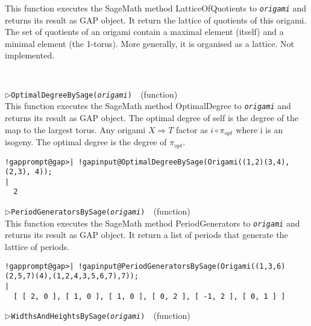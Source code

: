 \documentclass[a4paper,11pt]{report}
\begin{document}
{{{ This function executes the SageMath method LatticeOfQuotients to \mbox{\texttt{\mdseries\slshape origami}} and returns its result as \textsf{GAP} object. It return the lattice of quotients of this origami. The set of
quotients of an origami contain a maximal element (itself) and a minimal
element (the 1-torus). More generally, it is organised as a lattice. Not
implemented. 
\begin{Verbatim}[commandchars=!@|,fontsize=\small,frame=single,label=Example]
  
\end{Verbatim}
 \noindent\textcolor{FuncColor}{$\triangleright$\enspace\texttt{OptimalDegreeBySage({\mdseries\slshape origami})
\label{OptimalDegreeBySage}
}\hfill{\scriptsize (function)}}\\


 This function executes the SageMath method OptimalDegree to \mbox{\texttt{\mdseries\slshape origami}} and returns its result as \textsf{GAP} object. The optimal degree of self is the degree of the map to the largest
torus. Any origami $X \Rightarrow T$ factor as $i \circ \pi_{opt}$ where i is an isogeny. The optimal degree is the degree of $\pi_{opt}$. 
\begin{Verbatim}[commandchars=!@|,fontsize=\small,frame=single,label=Example]
  !gapprompt@gap>| !gapinput@OptimalDegreeBySage(Origami((1,2)(3,4), (2,3), 4));
|
  2
\end{Verbatim}
 \noindent\textcolor{FuncColor}{$\triangleright$\enspace\texttt{PeriodGeneratorsBySage({\mdseries\slshape origami})
\label{PeriodGeneratorsBySage}
}\hfill{\scriptsize (function)}}\\


 This function executes the SageMath method PeriodGenerators to \mbox{\texttt{\mdseries\slshape origami}} and returns its result as \textsf{GAP} object. It return a list of periods that generate the lattice of periods. 
\begin{Verbatim}[commandchars=!@|,fontsize=\small,frame=single,label=Example]
  !gapprompt@gap>| !gapinput@PeriodGeneratorsBySage(Origami((1,3,6)(2,5,7)(4),(1,2,4,3,5,6,7),7));    
|
  [ [ 2, 0 ], [ 1, 0 ], [ 1, 0 ], [ 0, 2 ], [ -1, 2 ], [ 0, 1 ] ]
\end{Verbatim}
 \noindent\textcolor{FuncColor}{$\triangleright$\enspace\texttt{WidthsAndHeightsBySage({\mdseries\slshape origami})
\label{WidthsAndHeightsBySage}
}\hfill{\scriptsize (function)}}\\


}}}
\end{document}
